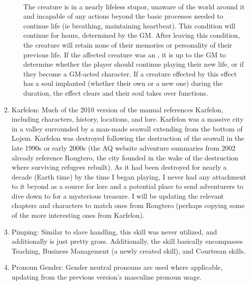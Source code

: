 \begin{enumerate}[leftmargin=12pt]
\begin{enumerate}
	\\
	The creature is in a nearly lifeless stupor, unaware of the world around it and incapable of any actions beyond the basic processes needed to continue life (ie breathing, maintaining heartbeat). This condition will continue for  hours, determined by the GM. After leaving this condition, the creature will retain none of their memories or personality of their previous life. If the affected creature was an , it is up to the GM to determine whether the player should continue playing their new life, or if they become a GM-acted character. If a creature effected by this effect has a soul implanted (whether their own or a new one) during the duration, the effect clears and their soul takes over functions.
\end{enumerate}
\item Karfelon: Much of the 2010 version of the manual references Karfelon, including characters, history, locations, and lore. Karfelon was a massive city in a valley surrounded by a man-made seawall extending from the bottom of Lojem. Karfelon was destroyed following the destruction of the seawall in the late 1990s or early 2000s (the AQ website adventure summaries from 2002 already reference Rougtero, the city founded in the wake of the destruction where surviving refugees rebuilt). As it had been destroyed for nearly a decade (Earth time) by the time I began playing, I never had any attachment to it beyond as a source for lore and a potential place to send adventurers to dive down to for a mysterious treasure. I will be updating the relevant chapters and characters to match ones from Rougtero (perhaps copying some of the more interesting ones from Karfelon).
\item Pimping: Similar to slave handling, this skill was never utilized, and additionally is just pretty gross. Additionally, the skill basically encompasses Teaching, Business Management (a newly created skill), and Courtesan skills. 
\item Pronoun Gender: Gender neutral pronouns are used where applicable, updating from the previous version's masculine pronoun usage.

\end{enumerate}
